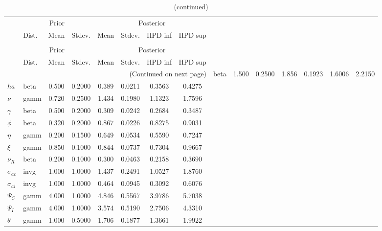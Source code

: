 
\begin{center}
\begin{longtable}{llcccccc} 
\caption{Results from Metropolis-Hastings (parameters)}
 \label{Table:MHPosterior:1}\\
\toprule 
  & \multicolumn{3}{c}{Prior}  &  \multicolumn{4}{c}{Posterior} \\
  \cmidrule(r{.75em}){2-4} \cmidrule(r{.75em}){5-8}
  & Dist. & Mean  & Stdev. & Mean & Stdev. & HPD inf & HPD sup\\
\midrule \endfirsthead 
\caption{(continued)}\\\toprule 
  & \multicolumn{3}{c}{Prior}  &  \multicolumn{4}{c}{Posterior} \\
  \cmidrule(r{.75em}){2-4} \cmidrule(r{.75em}){5-8}
  & Dist. & Mean  & Stdev. & Mean & Stdev. & HPD inf & HPD sup\\
\midrule \endhead 
\bottomrule \multicolumn{8}{r}{(Continued on next page)} \endfoot 
\bottomrule \endlastfoot 
${\sigma}$ & beta &   1.500 & 0.2500 &   1.856& 0.1923 &  1.6006 &  2.2150 \\ 
${ha}$ & beta &   0.500 & 0.2000 &   0.389& 0.0211 &  0.3563 &  0.4275 \\ 
$\nu$ & gamm &   0.720 & 0.2500 &   1.434& 0.1980 &  1.1323 &  1.7596 \\ 
$\gamma$ & beta &   0.500 & 0.2000 &   0.309& 0.0242 &  0.2684 &  0.3487 \\ 
${\phi}$ & beta &   0.320 & 0.2000 &   0.867& 0.0226 &  0.8275 &  0.9031 \\ 
${\eta}$ & gamm &   0.200 & 0.1500 &   0.649& 0.0534 &  0.5590 &  0.7247 \\ 
$\xi$ & gamm &   0.850 & 0.1000 &   0.844& 0.0737 &  0.7304 &  0.9667 \\ 
${\nu_R}$ & beta &   0.200 & 0.1000 &   0.300& 0.0463 &  0.2158 &  0.3690 \\ 
${\sigma_{ac}}$ & invg &   1.000 & 1.0000 &   1.437& 0.2491 &  1.0527 &  1.8760 \\ 
${\sigma_{ai}}$ & invg &   1.000 & 1.0000 &   0.464& 0.0945 &  0.3092 &  0.6076 \\ 
${\Psi_{C}}$ & gamm &   4.000 & 1.0000 &   4.846& 0.5567 &  3.9786 &  5.7038 \\ 
${\Psi_I}$ & gamm &   4.000 & 1.0000 &   3.574& 0.5190 &  2.7506 &  4.3310 \\ 
${\theta}$ & gamm &   1.000 & 0.5000 &   1.706& 0.1877 &  1.3661 &  1.9922 \\ 

\end{longtable}
\end{center}
